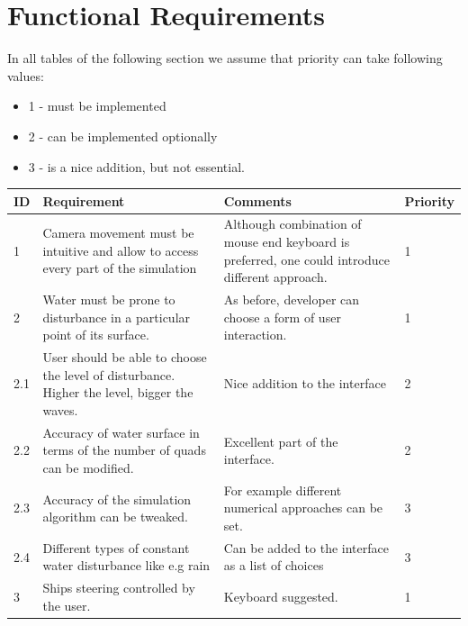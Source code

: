 \documentclass{report}
\begin{document}
\section{Functional Requirements}
In all tables of the following section we assume that priority can take following values:
\begin{itemize}
\item 1 - must be implemented
\item 2 - can be implemented optionally
\item 3 - is a nice addition, but not essential.
\end{itemize}

\begin{center}
\hspace*{-2.1cm}
	\begin{longtable}{| l | p{4cm} | p{3.5cm} | l |}
	
		\hline
	  	ID & Requirement & Comments & Priority \\
		\hline
		
		1 & 
		Camera movement must be intuitive and allow to access every part of the simulation
 & Although combination of mouse end keyboard is preferred, one could introduce different approach.
		 &
		1 
		\\ \hline
		
		2 & 
		Water must be prone to disturbance in a particular point of its surface. & As before, developer can choose a form of user interaction.
		 &
		1 
		\\ \hline		
	
		2.1 & 
		User should be able to choose the level of disturbance. Higher the level, bigger the waves. & Nice addition to the interface 
		 &
		2 
		\\ \hline		
	
			2.2 & 
		Accuracy of water surface in terms of the number of quads can be modified. & Excellent part of the interface. 
		 &
		2 
		\\ \hline		
		
		2.3 & 
		Accuracy of the simulation algorithm can be tweaked.
& For example different numerical approaches can be set.

		 &
		3 
		\\ \hline			

		2.4 & 
		Different types of constant water disturbance like e.g rain& Can be added to the interface as a list of choices
		 &
		3 
		\\ \hline		

		3 & 
		Ships steering controlled by the user.&  Keyboard suggested.
		 &
		1 
		\\ \hline	


\end{longtable}
\end{center}
\end{document}

